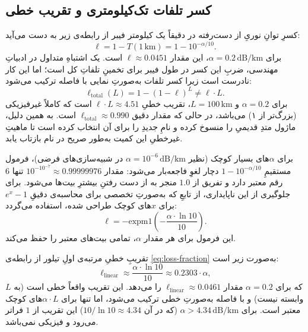 \subsection{کسر تلفات تک‌کیلومتری و تقریب خطی}

کسرِ توانِ نوریِ از دست‌رفته در دقیقاً یک کیلومتر فیبر از رابطه‌ی زیر به دست می‌آید:
\begin{equation}
	\ell = 1 - T(1\,\text{km}) = 1 - 10^{-\alpha/10}.
	\label{eq:loss-fraction}
\end{equation}
برای $\alpha = 0.2\,\text{dB/km}$، این مقدار $\ell \approx 0.0451$ است. یک اشتباهِ متداول در ادبیاتِ مهندسی، ضربِ این کسر در طول فیبر برای تخمینِ تلفاتِ کل است؛ اما این کار نادرست است زیرا کسر تلفات به‌صورتِ نمایی با فاصله ترکیب می‌شود:
\begin{equation}
	\ell_{\text{total}}(L) = 1 - (1-\ell)^L \neq \ell \cdot L.
	\label{eq:nonlinear-composition}
\end{equation}
برای $\alpha = 0.2$ و $L = 100\,\text{km}$، تقریب خطیِ $\ell \cdot L \approx 4.51$ است که کاملاً غیرفیزیکی (بزرگ‌تر از ۱) می‌باشد، در حالی که مقدار دقیق $\ell_{\text{total}} \approx 0.990$ است. به همین دلیل، ماژول  متدِ قدیمیِ  را منسوخ کرده و نامِ جدیدِ  را برای آن انتخاب کرده است تا ماهیتِ غیرخطیِ این کمیت به‌طور صریح در نام بازتاب یابد.

برای $\alpha$‌های بسیار کوچک (نظیر $\alpha = 10^{-6}\,\text{dB/km}$ در شبیه‌سازی‌های فرضی)، فرمول مستقیمِ $1 - 10^{-\alpha/10}$ دچار لغوِ فاجعه‌بار  می‌شود: مقدار $10^{-10^{-7}} \approx 0.99999976$ تنها $6$ رقم معتبر دارد و تفریق از $1.0$ منجر به از دست رفتنِ بیشترِ بیت‌ها می‌شود. برای جلوگیری از این ناپایداری، از تابعِ  که به‌صورتِ تخصصی برای محاسبه‌ی دقیقِ $e^x - 1$ برای $x$‌های کوچک طراحی شده، استفاده می‌گردد:
\begin{equation}
	\ell = -\mathrm{expm1}\!\left(-\frac{\alpha \cdot \ln 10}{10}\right).
	\label{eq:expm1-stable}
\end{equation}
این فرمول برای هر مقدار $\alpha$، تمامی بیت‌های معتبر را حفظ می‌کند.

تقریبِ خطیِ مرتبه‌ی اولِ تیلور از رابطه‌ی \eqref{eq:loss-fraction} به‌صورت زیر است:
\begin{equation}
	\ell_{\text{linear}} \approx \frac{\alpha \cdot \ln 10}{10} \approx 0.2303 \cdot \alpha,
	\label{eq:linear-approx}
\end{equation}
که برای $\alpha = 0.2$ مقدار $\ell_{\text{linear}} \approx 0.0461$ را می‌دهد. این تقریب واقعاً خطی است (به $L$ وابسته نیست) و با فاصله به‌صورتِ خطی ترکیب می‌شود، اما تنها برای $\alpha \cdot L$‌های کوچک معتبر است. برای $\alpha > 4.34\,\text{dB/km}$ (که در آن $10/\ln 10 \approx 4.34$) این تقریب از $1$ فراتر می‌رود و فیزیکی نمی‌باشد.

